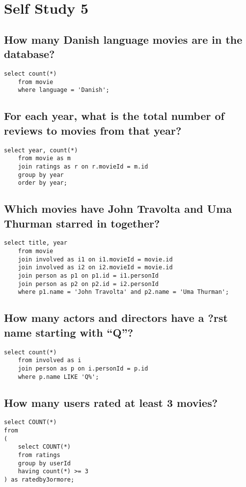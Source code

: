 \documentclass[a4paper,11pt]{memoir}
\begin{document}
\chapter{Self Study 5}

\section{How many Danish language movies are in the database?}
\begin{lstlisting}
select count(*) 
	from movie
	where language = 'Danish';
\end{lstlisting}

\section{For each year, what is the total number of reviews to movies from that year?}
\begin{lstlisting}
select year, count(*)
	from movie as m
	join ratings as r on r.movieId = m.id
	group by year
	order by year;
\end{lstlisting}

\section{Which movies have John Travolta and Uma Thurman starred in together?}
\begin{lstlisting}
select title, year
	from movie 
	join involved as i1 on i1.movieId = movie.id
	join involved as i2 on i2.movieId = movie.id
	join person as p1 on p1.id = i1.personId
	join person as p2 on p2.id = i2.personId
	where p1.name = 'John Travolta' and p2.name = 'Uma Thurman';
\end{lstlisting}

\section{How many actors and directors have a ?rst name starting with ``Q''?}
\begin{lstlisting}
select count(*) 
	from involved as i
	join person as p on i.personId = p.id
	where p.name LIKE 'Q%';
\end{lstlisting}

\section{How many users rated at least 3 movies?}
\begin{lstlisting}
select COUNT(*)
from 
(
	select COUNT(*)
	from ratings 
	group by userId
	having count(*) >= 3
) as ratedby3ormore;
\end{lstlisting}
\end{document}
